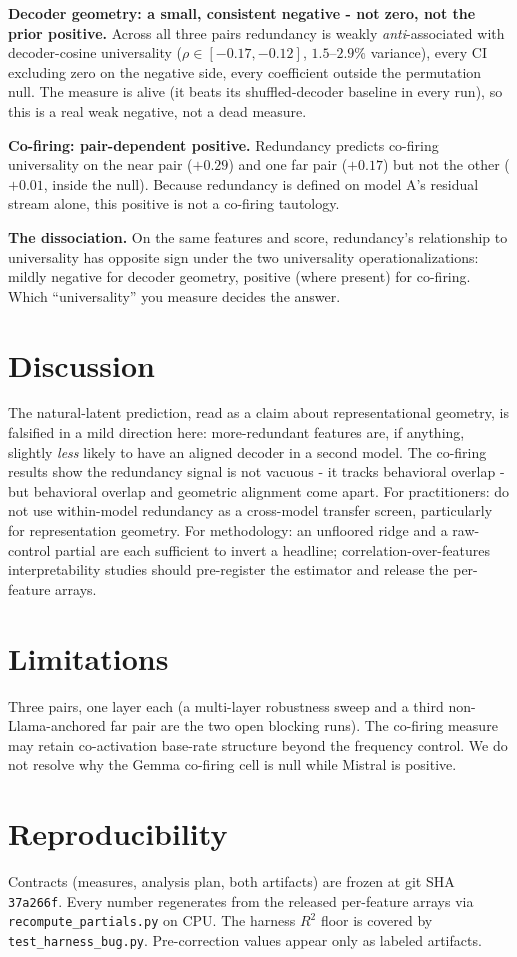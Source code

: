 \documentclass[11pt]{article}
\begin{document}
\textbf{Decoder geometry: a small, consistent negative - not zero, not the prior positive.} Across all
three pairs redundancy is weakly \emph{anti}-associated with decoder-cosine universality
($\rho\in[-0.17,-0.12]$, $1.5$--$2.9\%$ variance), every CI excluding zero on the negative side, every
coefficient outside the permutation null. The measure is alive (it beats its shuffled-decoder baseline in
every run), so this is a real weak negative, not a dead measure.

\textbf{Co-firing: pair-dependent positive.} Redundancy predicts co-firing universality on the near pair
($+0.29$) and one far pair ($+0.17$) but not the other ($+0.01$, inside the null). Because redundancy is
defined on model A's residual stream alone, this positive is not a co-firing tautology.

\textbf{The dissociation.} On the same features and score, redundancy's relationship to universality has
opposite sign under the two universality operationalizations: mildly negative for decoder geometry,
positive (where present) for co-firing. Which ``universality'' you measure decides the answer.

\section{Discussion}
The natural-latent prediction, read as a claim about representational geometry, is falsified in a mild
direction here: more-redundant features are, if anything, slightly \emph{less} likely to have an aligned
decoder in a second model. The co-firing results show the redundancy signal is not vacuous - it tracks
behavioral overlap - but behavioral overlap and geometric alignment come apart. For practitioners: do not
use within-model redundancy as a cross-model transfer screen, particularly for representation geometry.
For methodology: an unfloored ridge and a raw-control partial are each sufficient to invert a headline;
correlation-over-features interpretability studies should pre-register the estimator and release the
per-feature arrays.

\section{Limitations}
Three pairs, one layer each (a multi-layer robustness sweep and a third non-Llama-anchored far pair are
the two open blocking runs). The co-firing measure may retain co-activation base-rate structure beyond
the frequency control. We do not resolve why the Gemma co-firing cell is null while Mistral is positive.

\section*{Reproducibility}
Contracts (measures, analysis plan, both artifacts) are frozen at git SHA \texttt{37a266f}. Every number
regenerates from the released per-feature arrays via \texttt{recompute\_partials.py} on CPU. The harness
$R^2$ floor is covered by \texttt{test\_harness\_bug.py}. Pre-correction values appear only as labeled
artifacts.
\end{document}
